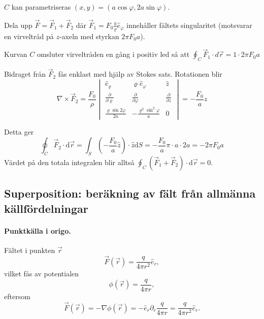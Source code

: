 \documentclass[%
oneside,                 %
final,                   %
10pt]{article}
\begin{document}
$C$ kan parametriseras $(x,y) = (a\cos\varphi,2a\sin\varphi)$.

Dela upp $\vec{F} = \vec{F}_1 + \vec{F}_2$ där $\vec F_1=F_0 \frac{a}{\varrho}\hat{e}_\varphi$ innehåller fältets singularitet
(motsvarar en virveltråd på $z$-axeln med styrkan $2\pi F_0a$). 

Kurvan $C$ omsluter virveltråden en gång i positiv led så att $\oint_C \vec{F}_1 \cdot d\vec{r} = 1 \cdot 2\pi F_0a$

Bidraget från $\vec F_2$ fås enklast med hjälp av Stokes sats. Rotationen blir
\begin{equation}
  \nabla \times\vec{F}_2 = \frac{F_0}{\rho} 
  	\begin{vmatrix}
	\hat{e}_\varrho & \varrho \hat{e}_\varphi & \hat z \\ 
	\frac{\partial}{\partial \varrho} & \frac{\partial}{\partial \varphi} &
                       \frac{\partial}{\partial z} \\ 
	\frac{\varrho \sin 2\varphi}{2a} & -\frac{\varrho^2\sin^2 \varphi}{a} & 0
	\end{vmatrix} =- \frac{F_0}{a}\hat z
\end{equation}

Detta ger 
\begin{equation}
\oint_C \vec{F}_2 \cdot \mbox{d}\vec{r} = \int_S \left( - \frac{F_0}{a}\hat z \right) \cdot \hat{z} \mbox{d}S = - \frac{F_0}{a} \pi \cdot a \cdot 2a = - 2 \pi F_0 a
\end{equation}
Värdet på den totala integralen blir alltså $\oint_C (\vec{F}_1 + \vec{F}_2) \cdot \mbox{d}\vec{r} = 0$.

\subsection{Superposition: beräkning av fält från allmänna källfördelningar}

\paragraph{Punktkälla i origo.}
Fältet i punkten $\vec{r}$
\begin{equation}
  \vec{F}(\vec{r}) = \frac{q}{4 \pi r^2} \hat{e}_r,
\end{equation}
vilket fås av potentialen
\begin{equation}
  \phi(\vec{r}) = \frac{q}{4 \pi r},
\end{equation}
eftersom
\begin{equation}
  \vec{F}(\vec{r}) = -\nabla \phi(\vec{r}) = - \hat{e}_r \partial_r \frac{q}{4 \pi r} = \frac{q}{4 \pi r^2} \hat{e}_r.
\end{equation}
\end{document}
